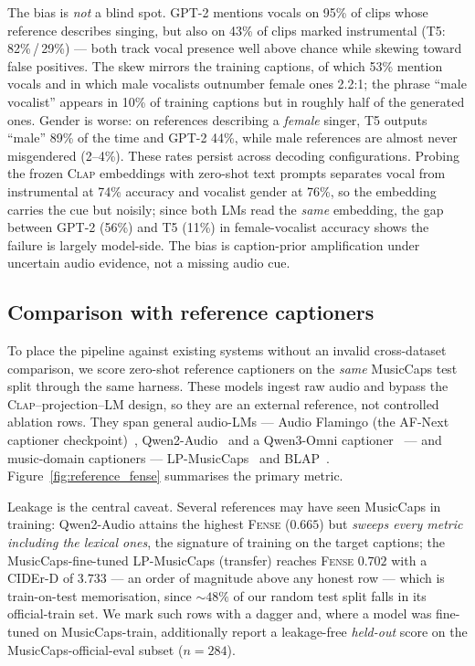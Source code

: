 \documentclass[conference]{IEEEtran}
\newcommand{\fense}{\textsc{Fense}}
\newcommand{\clapenc}{\textsc{Clap}}
\begin{document}
The bias is \emph{not} a blind spot. GPT-2 mentions vocals on 95\% of clips whose reference
describes singing, but also on 43\% of clips marked instrumental (T5: 82\%\,/\,29\%) --- both
track vocal presence well above chance while skewing toward false positives. The skew mirrors
the training captions, of which 53\% mention vocals and in which male vocalists outnumber female
ones 2.2:1; the phrase ``male vocalist'' appears in 10\% of training captions but in roughly half
of the generated ones. Gender is worse: on references describing a \emph{female} singer, T5
outputs ``male'' 89\% of the time and GPT-2 44\%, while male references are almost never
misgendered (2--4\%). These rates persist across decoding configurations. Probing the frozen
\clapenc{} embeddings with zero-shot text prompts separates vocal from instrumental at 74\%
accuracy and vocalist gender at 76\%, so the embedding carries the cue but noisily; since both
LMs read the \emph{same} embedding, the gap between GPT-2 (56\%) and T5 (11\%) in
female-vocalist accuracy shows the failure is largely model-side. The bias is caption-prior
amplification under uncertain audio evidence, not a missing audio cue.

\subsection{Comparison with reference captioners}\label{sec:reference}

To place the pipeline against existing systems without an invalid cross-dataset comparison, we
score zero-shot reference captioners on the \emph{same} MusicCaps test split through the same
harness. These models ingest raw audio and bypass the \clapenc{}--projection--LM design, so they
are an external reference, not controlled ablation rows. They span general audio-LMs --- Audio
Flamingo (the AF-Next captioner checkpoint)~\cite{ghosh2026afnext},
Qwen2-Audio~\cite{chu2024qwen2audio} and a Qwen3-Omni captioner~\cite{xu2025qwen3omni} --- and
music-domain captioners --- LP-MusicCaps~\cite{doh2023lpmusiccaps} and
BLAP~\cite{lanzendorfer2025blap}. Figure~\ref{fig:reference_fense} summarises the primary metric.

Leakage is the central caveat. Several references may have seen MusicCaps in training:
Qwen2-Audio attains the highest \fense{} ($0.665$) but \emph{sweeps every metric including the
lexical ones}, the signature of training on the target captions; the MusicCaps-fine-tuned
LP-MusicCaps (transfer) reaches \fense{} $0.702$ with a CIDEr-D of $3.733$ --- an order of
magnitude above any honest row --- which is train-on-test memorisation, since ${\sim}48\%$ of
our random test split falls in its official-train set. We mark such rows with a dagger and,
where a model was fine-tuned on MusicCaps-train, additionally report a leakage-free
\emph{held-out} score on the MusicCaps-official-eval subset ($n{=}284$).
\end{document}
